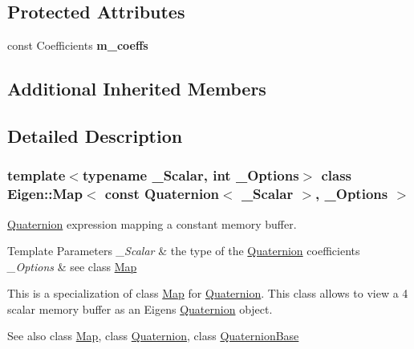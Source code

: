\subsection*{Protected Attributes}
\begin{DoxyCompactItemize}
\item 
\mbox{\label{class_eigen_1_1_map_3_01const_01_quaternion_3_01___scalar_01_4_00_01___options_01_4_ad4ba1d1bad1e8d0e9428963b9d682985}} 
const Coefficients {\bfseries m\+\_\+coeffs}
\end{DoxyCompactItemize}
\subsection*{Additional Inherited Members}


\subsection{Detailed Description}
\subsubsection*{template$<$typename \+\_\+\+Scalar, int \+\_\+\+Options$>$\newline
class Eigen\+::\+Map$<$ const Quaternion$<$ \+\_\+\+Scalar $>$, \+\_\+\+Options $>$}

\mbox{\hyperlink{class_eigen_1_1_quaternion}{Quaternion}} expression mapping a constant memory buffer. 


\begin{DoxyTemplParams}{Template Parameters}
{\em \+\_\+\+Scalar} & the type of the \mbox{\hyperlink{class_eigen_1_1_quaternion}{Quaternion}} coefficients \\
\hline
{\em \+\_\+\+Options} & see class \mbox{\hyperlink{class_eigen_1_1_map}{Map}}\\
\hline
\end{DoxyTemplParams}
This is a specialization of class \mbox{\hyperlink{class_eigen_1_1_map}{Map}} for \mbox{\hyperlink{class_eigen_1_1_quaternion}{Quaternion}}. This class allows to view a 4 scalar memory buffer as an Eigen\textquotesingle{}s \mbox{\hyperlink{class_eigen_1_1_quaternion}{Quaternion}} object.

\begin{DoxySeeAlso}{See also}
class \mbox{\hyperlink{class_eigen_1_1_map}{Map}}, class \mbox{\hyperlink{class_eigen_1_1_quaternion}{Quaternion}}, class \mbox{\hyperlink{class_eigen_1_1_quaternion_base}{Quaternion\+Base}} 
\end{DoxySeeAlso}


